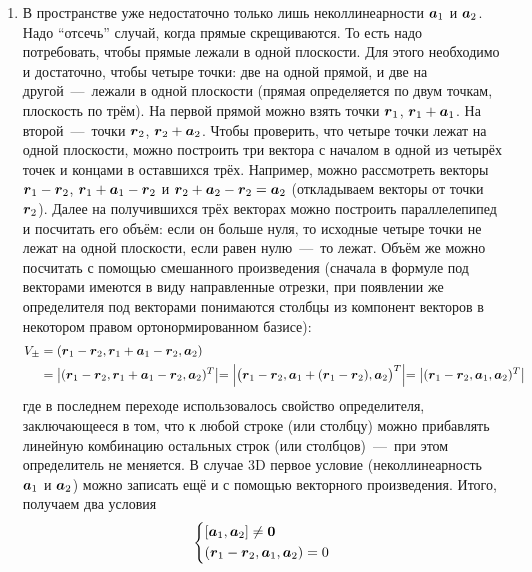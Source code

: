 \documentclass[a4paper,12pt]{article}
\begin{document}
\begin{solution}
    \begin{enumerate}
      \item В пространстве уже недостаточно только лишь неколлинеарности $\boldsymbol a_1$ и $\boldsymbol a_2$.
      Надо ``отсечь'' случай, когда прямые скрещиваются.
      То есть надо потребовать, чтобы прямые лежали в одной плоскости.
      Для этого необходимо и достаточно, чтобы четыре точки: две на одной прямой, и две на другой~---~лежали в одной плоскости (прямая определяется по двум точкам, плоскость по трём).
      На первой прямой можно взять точки $\boldsymbol r_1$, $\bds r_1 \hm+ \bds a_1$.
      На второй~---~точки $\boldsymbol r_2$, $\bds r_2 \hm+ \bds a_2$.
      Чтобы проверить, что четыре точки лежат на одной плоскости, можно построить три вектора с началом в одной из четырёх точек и концами в оставшихся трёх.
      Например, можно рассмотреть векторы $\bds r_1 \hm- \bds r_2$, $\bds r_1 \hm+ \bds a_1 \hm- \bds r_2$ и $\bds r_2 \hm+ \bds a_2 \hm- \bds r_2 \hm= \bds a_2$ (откладываем векторы от точки $\boldsymbol r_2$).
      Далее на получившихся трёх векторах можно построить параллелепипед и посчитать его объём: если он больше нуля, то исходные четыре точки не лежат на одной плоскости, если равен нулю~---~то лежат.
      Объём же можно посчитать с помощью смешанного произведения (сначала в формуле под векторами имеются в виду направленные отрезки, при появлении же определителя под векторами понимаются столбцы из компонент векторов в некотором правом ортонормированном базисе):
      \begin{equation*}
      \begin{split}
        V_{\pm} &= (\boldsymbol r_1 - \boldsymbol r_2, \boldsymbol r_1 + \boldsymbol a_1 - \boldsymbol r_2, \boldsymbol a_2)\\
        &= \bigl|(\boldsymbol r_1 - \boldsymbol r_2, \boldsymbol r_1 + \boldsymbol a_1 - \boldsymbol r_2, \boldsymbol a_2)^T\bigl|
        = \Bigl|\bigl(\boldsymbol r_1 - \boldsymbol r_2, \boldsymbol a_1 + (\boldsymbol r_1 - \boldsymbol r_2), \boldsymbol a_2\bigr)^T\Bigl|
        = \bigl|(\boldsymbol r_1 - \boldsymbol r_2, \boldsymbol a_1, \boldsymbol a_2)^T\bigl|
      \end{split}
      \end{equation*}
      где в последнем переходе использовалось свойство определителя, заключающееся в том, что к любой строке (или столбцу) можно прибавлять линейную комбинацию остальных строк (или столбцов)~---~при этом определитель не меняется.
      В случае $3$D первое условие (неколлинеарность $\boldsymbol a_1$ и $\boldsymbol a_2$) можно записать ещё и с помощью векторного произведения.
      Итого, получаем два условия
      \[
        \left\{
          \begin{aligned}
            &[\boldsymbol a_1, \boldsymbol a_2] \not= \boldsymbol 0\\
            &(\boldsymbol r_1 - \boldsymbol r_2, \boldsymbol a_1, \boldsymbol a_2) = 0
          \end{aligned}
        \right.
      \]
      

\end{enumerate}
\end{solution}
\end{document}
